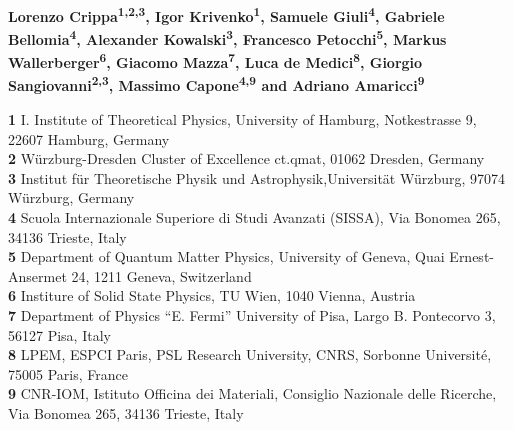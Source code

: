 \documentclass[dvipsnames]{SciPost}
\begin{document}
\pagestyle{SPstyle}

\begin{center}{\Large \textbf{\color{scipostdeepblue}{
EDIpack: A generic and interoperable Lanczos-based solver for quantum impurity problems\\
}}}\end{center}




\begin{center}\textbf{
    Lorenzo Crippa\textsuperscript{1,2,3},
    Igor Krivenko\textsuperscript{1},
    Samuele Giuli\textsuperscript{4},
    Gabriele Bellomia\textsuperscript{4},
    Alexander Kowalski\textsuperscript{3},
    Francesco Petocchi\textsuperscript{5},
    Markus Wallerberger\textsuperscript{6},
    Giacomo Mazza\textsuperscript{7},
    Luca de Medici\textsuperscript{8},
    Giorgio Sangiovanni\textsuperscript{2,3},
    Massimo Capone\textsuperscript{4,9} and 
    Adriano Amaricci\textsuperscript{9}    
}\end{center}



\begin{center}
  \newcommand{\CNRIOM}{CNR-IOM, Istituto Officina dei Materiali,
  Consiglio Nazionale delle Ricerche, Via Bonomea 265, 34136
  Trieste, Italy}
\newcommand{\SISSA}{Scuola Internazionale Superiore di Studi Avanzati (SISSA),
  Via Bonomea 265, 34136 Trieste, Italy}
\newcommand{\ITPHamburg}{I. Institute of Theoretical Physics,
  University of Hamburg, Notkestrasse 9, 22607 Hamburg, Germany}
\newcommand{\WZBURG}{Institut f\"ur Theoretische Physik und
  Astrophysik,Universit\"at W\"urzburg, 97074 W\"urzburg, Germany}
\newcommand{\CTQMAT}{W\"urzburg-Dresden Cluster of Excellence ct.qmat, 01062 Dresden, Germany}
\newcommand{\Geneve}{Department of Quantum Matter Physics, University of
  Geneva, Quai Ernest-Ansermet 24, 1211 Geneva, Switzerland}
\newcommand{\UPISA}{Department of Physics ``E. Fermi'' University of
  Pisa, Largo B. Pontecorvo 3, 56127 Pisa, Italy}
\newcommand{\ESPCI}{LPEM, ESPCI Paris, PSL Research University, CNRS, Sorbonne Universit\'e, 75005 Paris, France}
\newcommand{\TUW}{Institure of Solid State Physics, TU Wien, 1040 Vienna, Austria}
{\bf 1} \ITPHamburg\\
{\bf 2} \CTQMAT\\
{\bf 3} \WZBURG\\
{\bf 4} \SISSA\\
{\bf 5} \Geneve\\
{\bf 6} \TUW\\   
{\bf 7} \UPISA\\
{\bf 8} \ESPCI\\
{\bf 9} \CNRIOM\\
\end{center}
\end{document}
